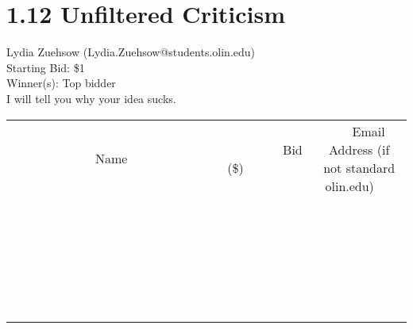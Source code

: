 \documentclass[11pt]{article}
\begin{document}
\section*{1.12 Unfiltered Criticism}
Lydia Zuehsow (Lydia.Zuehsow@students.olin.edu) \\
Starting Bid: \$1 \\
Winner(s): 
Top bidder \\
I will tell you why your idea sucks. \\[6ex]
\begin{tabular}{c c c}
~~~~~~~~~~~~~Name~~~~~~~~~~~~~ & ~~~~~~~~~Bid (\$)~~~~~~~~~ & ~~~Email Address (if not standard olin.edu)~~~ \\
 & & \\
\hline
 & & \\
\hline
 & & \\
\hline
 & & \\
\hline
 & & \\
\hline
 & & \\
\hline
 & & \\
\hline
 & & \\
\hline
 & & \\
\hline
 & & \\
\hline
 & & \\
\hline
 & & \\
\hline
 & & \\
\hline
 & & \\
\hline
 & & \\
\hline
 & & \\
\hline
 & & \\
\hline
 & & \\
\hline
 & & \\
\hline
 & & \\
\hline
 & & \\
\hline
 & & \\
\hline
 & & \\
\hline
 & & \\
\hline
 & & \\
\hline
 & & \\
\hline
\end{tabular}
\clearpage
\end{document}
